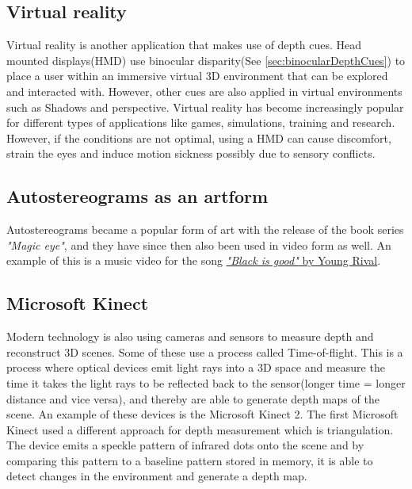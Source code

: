 	\subsection{Virtual reality}
	Virtual reality is another application that makes use of depth cues. Head mounted displays(HMD) use binocular disparity(See \autoref{sec:binocularDepthCues}) to place a user within an immersive virtual 3D environment that can be explored and interacted with\citep{hmdCues}. However, other cues are also applied in virtual environments such as Shadows and perspective. Virtual reality has become increasingly popular for different types of applications like games, simulations, training and research. However, if the conditions are not optimal, using a HMD can cause discomfort, strain the eyes and induce motion sickness possibly due to sensory conflicts\citep{hmdCues,motionSickness}.

	\subsection{Autostereograms as an artform}
	Autostereograms became a popular form of art with the release of the book series \textit{"Magic eye"}\citep{autostereograms}, and they have since then also been used in video form as well. An example of this is a music video for the song \href{https://www.youtube.com/watch?v=2AKtp3XHn38}{\color{blue}\textit{"Black is good"} by Young Rival}.

	\subsection{Microsoft Kinect}
	Modern technology is also using cameras and sensors to measure depth and reconstruct 3D scenes. Some of these use a process called Time-of-flight. This is a process where optical devices emit light rays into a 3D space and measure the time it takes the light rays to be reflected back to the sensor(longer time = longer distance and vice versa), and thereby are able to generate depth maps of the scene. An example of these devices is the Microsoft Kinect 2\citep{tof}. The first Microsoft Kinect used a different approach for depth measurement which is triangulation. The device emits a speckle pattern of infrared dots onto the scene and by comparing this pattern to a baseline pattern stored in memory, it is able to detect changes in the environment and generate a depth map\citep{pointCloud}.
	
